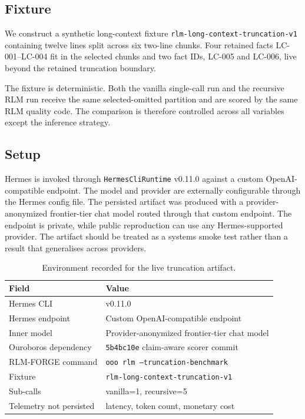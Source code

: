 \documentclass[11pt,a4paper]{article}
\begin{document}
\subsection{Fixture}

We construct a synthetic long-context fixture
\texttt{rlm-long-context-truncation-v1} containing twelve lines split
across six two-line chunks. Four retained facts
\textsc{LC-001}--\textsc{LC-004} fit in the selected chunks and two fact
IDs, \textsc{LC-005} and \textsc{LC-006}, live beyond the retained
truncation boundary.

The fixture is deterministic. Both the vanilla single-call run and the
recursive RLM run receive the same selected-omitted partition and are
scored by the same RLM quality code. The comparison is therefore controlled
across all variables except the inference strategy.

\subsection{Setup}

Hermes is invoked through \texttt{HermesCliRuntime} v0.11.0 against a
custom OpenAI-compatible endpoint. The model and provider are externally
configurable through the Hermes config file. The persisted artifact was
produced with a provider-anonymized frontier-tier chat model routed through
that custom endpoint. The endpoint is private, while public reproduction can
use any Hermes-supported provider. The artifact should be treated as a
systems smoke test rather than a result that generalises across providers.

\begin{table}[t]
\centering
\caption{Environment recorded for the live truncation artifact.}
\label{tab:environment}
\small
\begin{tabular}{ll}
\toprule
Field & Value \\
\midrule
Hermes CLI & v0.11.0 \\
Hermes endpoint & Custom OpenAI-compatible endpoint \\
Inner model & Provider-anonymized frontier-tier chat model \\
Ouroboros dependency & \texttt{5b4bc10e} claim-aware scorer commit \\
RLM-FORGE command & \texttt{ooo rlm --truncation-benchmark} \\
Fixture & \texttt{rlm-long-context-truncation-v1} \\
Sub-calls & vanilla=1, recursive=5 \\
Telemetry not persisted & latency, token count, monetary cost \\
\bottomrule
\end{tabular}
\end{table}
\end{document}
